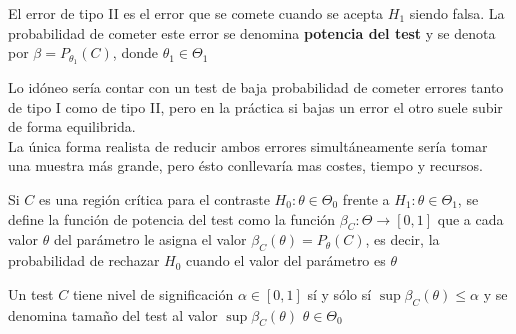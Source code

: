 \begin{definición}
    El error de tipo II es el error que se comete cuando se acepta $H_{1}$ siendo falsa. La probabilidad de cometer este error se denomina \textbf{potencia del test} y se denota por $\beta=P_{\theta_{1}}(C)$, donde $\theta_{1} \in \Theta_{1}$
\end{definición}


\begin{observación}
    Lo idóneo sería contar con un test de baja probabilidad de cometer errores tanto de tipo I como de tipo II, pero en la práctica si bajas un error el otro suele subir de forma equilibrida. \\
    La única forma realista de reducir ambos errores simultáneamente sería tomar una muestra más grande, pero ésto conllevaría mas costes, tiempo y recursos. 
\end{observación}

\begin{definición} 
Si $C$ es una región crítica para el contraste $H_{0}: \theta \in \Theta_{0}$ frente a $H_{1}: \theta \in \Theta_{1}$, se define la función de potencia del test como la función $\beta_{C}: \Theta \rightarrow[0,1]$ que a cada valor $\theta$ del parámetro le asigna el valor $\beta_{C}(\theta)=P_{\theta}(C)$, es decir, la probabilidad de rechazar $H_{0}$ cuando el valor del parámetro es $\theta$
\end{definición}

\begin{definición} 
Un test $C$ tiene nivel de significación $\alpha \in[0,1]$ sí y sólo sí $\sup \beta_{C}(\theta) \leq \alpha$ y se denomina tamaño del test al valor $\sup \beta_{C}(\theta)$ $\theta \in \Theta_{0}$
\end{definición}



